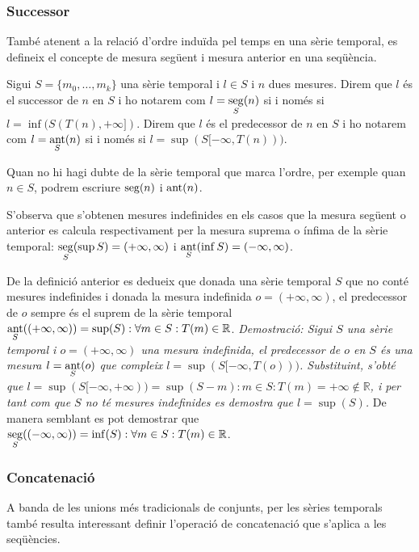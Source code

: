 \subsubsection{Successor}


També atenent a la relació d'ordre induïda pel temps en una sèrie temporal, es
defineix el concepte de mesura següent i mesura anterior en una
seqüència.

\begin{definition}
  Sigui $S=\{m_0, \ldots, m_k\}$ una sèrie temporal i $l\in S$ i $n$ dues
  mesures. Direm que $l$ és el successor de $n$ en $S$ i ho notarem
  com $l=\operatorname*{seg}\limits_S(n)$ si i només si $l=\inf(S(T(n),+\infty])$.
  Direm que $l$ és el predecessor de $n$ en $S$ i ho notarem com
  $l=\operatorname*{ant}\limits_S(n)$ si i només si $l=\sup(S[-\infty,T(n)))$.

Quan no hi hagi dubte de la sèrie temporal que marca l'ordre, per
exemple quan $n\in S$, podrem escriure $\operatorname*{seg}(n)$ i $\operatorname*{ant}(n)$.
\end{definition}

S'observa que s'obtenen mesures indefinides en els casos que la
mesura següent o anterior es calcula respectivament per la mesura
suprema o ínfima de la sèrie temporal: $\operatorname*{seg}\limits_S(\sup
S)=(+\infty,\infty)$ i $\operatorname*{ant}\limits_S(\inf S)=(-\infty,\infty)$.

De la definició anterior es dedueix que donada una sèrie temporal $S$
que no conté mesures indefinides i donada la mesura indefinida
$o=(+\infty,\infty)$, el predecessor de $o$ sempre és el suprem de la
sèrie temporal $\operatorname*{ant}\limits_S( (+\infty,\infty) ) = \sup(S): \forall
m\in S: T(m)\in\mathbb{R}$.  %
\emph{Demostració: Sigui $S$ una sèrie temporal i $o=(+\infty,\infty)$
  una mesura indefinida, el predecessor de $o$ en $S$ és una mesura
  $l=\operatorname*{ant}\limits_S(o)$ que compleix
  $l=\sup(S[-\infty,T(o)))$. Substituint, s'obté que
  $l=\sup(S[-\infty,+\infty))=\sup(S-m):m\in S:T(m)=+\infty \notin
  \mathbb{R}$, i per tant com que $S$ no té mesures indefinides es
  demostra que $l=\sup(S)$.  } De manera semblant es pot demostrar que
$\operatorname*{seg}\limits_S( (-\infty,\infty) ) = \inf(S): \forall m\in S:
T(m)\in\mathbb{R}$.


\subsubsection{Concatenació}

A banda de les unions més tradicionals de conjunts, per les sèries
temporals també resulta interessant definir l'operació de concatenació
que s'aplica a les seqüències.

